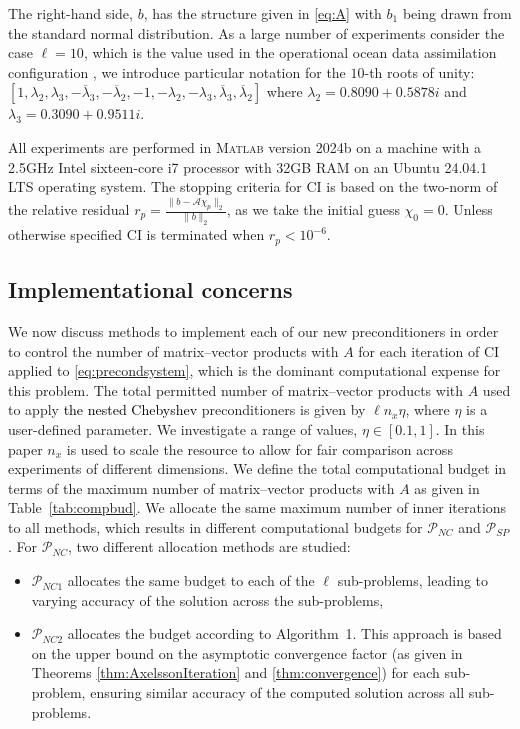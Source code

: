 \documentclass{article}
\newcommand{\jt}{\textcolor{black}}%
\newcommand{\resource}{\eta}
\theoremstyle{definition}
\begin{document}
{		
		The right-hand side, $b$, has the structure given in \eqref{eq:A} with $b_1$ being drawn from the standard normal distribution.
		As a large number of experiments consider the case $\ell = 10$,
		{{which is the  value used in  the operational ocean data assimilation configuration \cite{Chrust_2025}},} we introduce particular notation for the $10$-th roots of unity: $[1,\lambda_2,\lambda_3,-\overline{\lambda}_3,-\overline{\lambda}_2,-1,-\lambda_2,-\lambda_3,\overline{\lambda}_3,\overline{\lambda}_2]$ where
		$\lambda_2 = 0.8090 + 0.5878i$ and $\lambda_3 = 0.3090 + 0.9511i$. 
		
		
		
		All experiments are performed in {\scshape Matlab} version 2024b on a machine with a 2.5GHz Intel
		sixteen-core i7 processor with 32GB RAM on an Ubuntu 24.04.1 LTS operating system. The stopping criteria for CI is based on the two-norm  of the relative residual $r_p = \frac{\|b-\mathcal{A}\chi_p\|_2}{\|b\|_2}$, as we take the initial guess $\chi_0 = 0$.  Unless otherwise specified CI is terminated when $r_p < 10^{-6}$.
		
		\subsection{Implementational concerns}
		
		We now discuss methods to implement each of our new preconditioners in order to control the number of matrix--vector products with $A$ for each iteration of CI applied to \eqref{eq:precondsystem}, which is the dominant computational expense for this problem.    
		The total permitted number of matrix--vector products with $A$ used to apply \jt{the nested Chebyshev} preconditioners is given by $\ell n_x  \resource$, where $\resource$ is a user-defined parameter. We investigate a range of values, $\resource \in [0.1,1]$. In this paper $n_x$ is used to scale the resource to allow for fair comparison across experiments of different dimensions. We define the total computational  budget in terms of the maximum number of matrix--vector products with $A$ as given in Table~\ref{tab:compbud}. {We allocate the same maximum number of inner iterations to all methods, which results in different computational budgets for $\mathcal{P}_{NC}$ and $\mathcal{P}_{SP}$.}  For $\mathcal{P}_{NC}$, two different allocation methods are studied: 
		\begin{itemize}
			\item $\mathcal{P}_{NC1}$ allocates the same budget to each of the $\ell$ sub-problems, leading to varying accuracy of the solution across the sub-problems,
			\item $\mathcal{P}_{NC2}$ allocates the budget according to Algorithm~1. This approach is based on the upper bound on the asymptotic convergence factor (as given in Theorems \ref{thm:AxelssonIteration} and \ref{thm:convergence}) for each sub-problem, ensuring similar accuracy of the computed solution across all sub-problems.
		\end{itemize}
		
}
\end{document}
